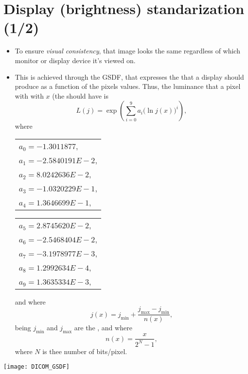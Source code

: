\section{Display (brightness) standarization (1/2)}
\begin{itemize}
\item To ensure \emph{visual consistency}, that image looks the same
  regardless of which monitor or display device it's viewed on.
\item This is achieved through the \gls{GSDF}, that expresses the
   that a display should produce as a function
  of the pixels values. Thus, the luminance that a pixel with with
   $x$ (the
  should have is
  \begin{equation}
    L(j) = \exp\left(\sum_{i=0}^{9}a_i\big(\ln j(x)\big)^i\right),
  \end{equation}
  where
  \begin{center}
  \begin{tabular}{l}
    $a_0 = -1.3011877$, \\
    $a_1 = -2.5840191E-2$, \\
    $a_2 = 8.0242636E-2$, \\
    $a_3 = -1.0320229E-1$, \\
    $a_4 = 1.3646699E-1$, \\
  \end{tabular}
  \begin{tabular}{l}
    $a_5 = 2.8745620E-2$, \\
    $a_6 = -2.5468404E-2$,\\
    $a_7 = -3.1978977E-3$, \\
    $a_8 = 1.2992634E-4$, \\
    $a_9 = 1.3635334E-3$,
  \end{tabular}
  \end{center}
  and where
  \begin{equation}
    j(x) = j_{\text{min}} + \frac{j_{\text{max}} - j_{\text{min}}}{n(x)},
  \end{equation}
  being $j_{\text{min}}$ and $j_{\text{max}}$ are the , and where
  \begin{equation}
    n(x) = \frac{x}{2^N-1},
  \end{equation}
  where $N$ is thee number of bits/pixel.
\end{itemize}
\begin{center}
  \texttt{[image: DICOM\_GSDF]}
\end{center}

